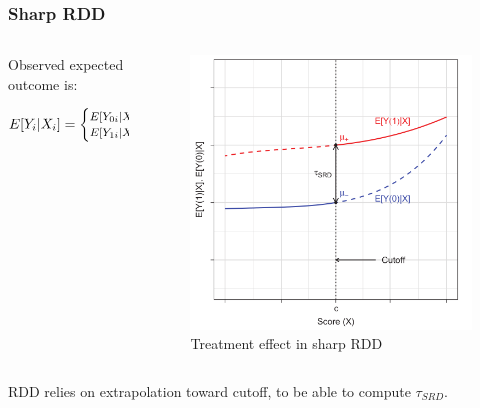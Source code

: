 \documentclass[12pt,english,dvipsnames,aspectratio=169,handout]{beamer}\usepackage[]{graphicx}\usepackage[]{xcolor}
\begin{document}
\begin{frame}
\frametitle{Sharp RDD}

\begin{columns}
	\begin{column}{0.55\textwidth}
		Observed expected outcome is:
		
		\begin{equation}
			\footnotesize
			E[Y_i | X_i] = \begin{cases}
				E[Y_{0i} | X_i], & if\; X_i < c \\
				E[Y_{1i} | X_i], & if\; X_i \geq c 
			\end{cases}
		\end{equation}
	\end{column}
	\begin{column}{0.45\textwidth}
		\begin{figure}
			\centering
			\includegraphics[scale=0.35]{../04-figures/07/04.PNG}
			\caption{Treatment effect in sharp RDD \cite{cattaneo_practical_2019}}
		\end{figure}
	\end{column}
\end{columns}
\pause

RDD relies on extrapolation toward cutoff, to be able to compute $\tau_{SRD}$.

\end{frame}
\end{document}
